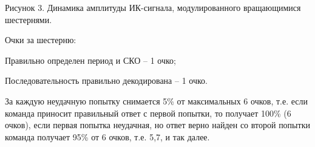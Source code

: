 
\begin{center}
    Рисунок 3. Динамика амплитуды ИК-сигнала, модулированного вращающимися шестернями.
\end{center}

\markSection

Очки за шестерню:

Правильно определен период и СКО – 1 очко;

Последовательность правильно декодирована – 1 очко.

За каждую неудачную попытку снимается 5\% от максимальных 6 очков, т.е. если команда приносит правильный ответ с первой попытки, то получает 100\% (6 очков), если первая попытка неудачная, но ответ верно найден со второй попытки команда получает 95\% от 6 очков, т.е. 5,7, и так далее.